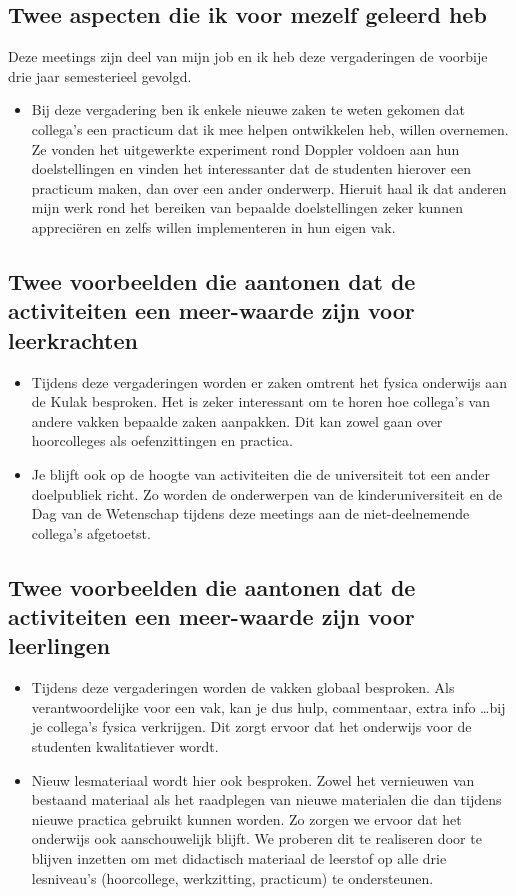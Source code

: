 \documentclass[a4paper,12pt,twoside]{article}%
\begin{document}
	\subsection{Twee aspecten die ik voor mezelf geleerd heb}
		Deze meetings zijn deel van mijn job en ik heb deze vergaderingen de voorbije drie jaar semesterieel gevolgd. 
	\begin{itemize}
		\item Bij deze vergadering ben ik enkele nieuwe zaken te weten gekomen dat collega's een practicum dat ik mee helpen ontwikkelen heb, willen overnemen. Ze vonden het uitgewerkte experiment rond Doppler voldoen aan hun doelstellingen en vinden het interessanter dat de studenten hierover een practicum maken, dan over een ander onderwerp. Hieruit haal ik dat anderen mijn werk rond het bereiken van bepaalde doelstellingen zeker kunnen appreciëren en zelfs willen implementeren in hun eigen vak.
	\end{itemize}


	\subsection{Twee voorbeelden die aantonen dat de activiteiten een meer-waarde zijn voor leerkrachten}
	\begin{itemize}
		\item Tijdens deze vergaderingen worden er zaken omtrent het fysica onderwijs aan de Kulak besproken. Het is zeker interessant om te horen hoe collega's van andere vakken bepaalde zaken aanpakken. Dit kan zowel gaan over hoorcolleges als oefenzittingen en practica. 
		\item Je blijft ook op de hoogte van activiteiten die de universiteit tot een ander doelpubliek richt. Zo worden de onderwerpen van de kinderuniversiteit en de Dag van de Wetenschap tijdens deze meetings aan de niet-deelnemende collega's afgetoetst.
	\end{itemize}


	\subsection{Twee voorbeelden die aantonen dat de activiteiten een meer-waarde zijn voor leerlingen}
	\begin{itemize}
		\item Tijdens deze vergaderingen worden de vakken globaal besproken. Als verantwoordelijke voor een vak, kan je dus hulp, commentaar, extra info \ldots bij je collega's fysica verkrijgen. Dit zorgt ervoor dat het onderwijs voor de studenten kwalitatiever wordt. 
		\item Nieuw lesmateriaal wordt hier ook besproken. Zowel het vernieuwen van bestaand materiaal als het raadplegen van nieuwe materialen die dan tijdens nieuwe practica gebruikt kunnen worden. Zo zorgen we ervoor dat het onderwijs ook aanschouwelijk blijft. We proberen dit te realiseren door te blijven inzetten om met didactisch materiaal de leerstof op alle drie lesniveau's (hoorcollege, werkzitting, practicum) te ondersteunen.
	\end{itemize}
	
\end{document}
